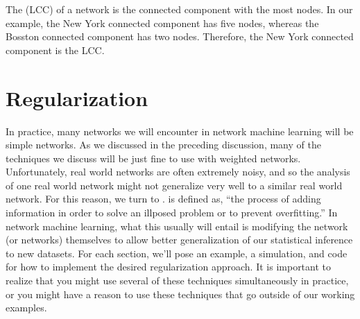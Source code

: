 \documentclass[letterpaper,10pt,english]{jupyterBook}
\begin{document}
\sphinxAtStartPar
The  (LCC) of a network is the connected component with the most nodes. In our example, the New York connected component has five nodes, whereas the Bosston connected component has two nodes. Therefore, the New York connected component is the LCC.


\section{Regularization}
\label{\detokenize{representations/ch4/regularization:regularization}}\label{\detokenize{representations/ch4/regularization::doc}}
\sphinxAtStartPar
In practice, many networks we will encounter in network machine learning will  be simple networks. As we discussed in the preceding discussion, many of the techniques we discuss will be just fine to use with weighted networks. Unfortunately, real world networks are often extremely noisy, and so the analysis of one real world network might not generalize very well to a similar real world network. For this reason, we turn to .  is defined as, “the process of adding information in order to solve an ill\sphinxhyphen{}posed problem or to prevent overfitting.” In network machine learning, what this usually will entail is modifying the network (or networks) themselves to allow better generalization of our statistical inference to new datasets. For each section, we’ll pose an example, a simulation, and code for how to implement the desired regularization approach. It is important to realize that you might use several of these techniques simultaneously in practice, or you might have a reason to use these techniques that go outside of our working examples.
\end{document}
